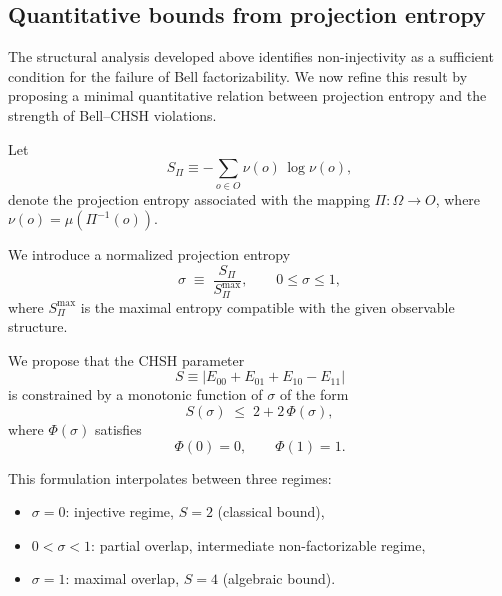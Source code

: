 \subsection{Quantitative bounds from projection entropy}
  \label{subsec:projection-entropy-bound}

  The structural analysis developed above identifies non-injectivity as a sufficient
  condition for the failure of Bell factorizability.
  We now refine this result by proposing a minimal quantitative relation between
  projection entropy and the strength of Bell--CHSH violations.

  Let
  \begin{equation}
    S_{\Pi} \equiv - \sum_{o \in O} \nu(o)\,\log \nu(o),
  \end{equation}
  denote the projection entropy associated with the mapping $\Pi : \Omega \to O$,
  where $\nu(o) = \mu(\Pi^{-1}(o))$.

  We introduce a normalized projection entropy
  \begin{equation}
    \sigma \;\equiv\; \frac{S_{\Pi}}{S_{\Pi}^{\max}},
    \qquad 0 \le \sigma \le 1,
  \end{equation}
  where $S_{\Pi}^{\max}$ is the maximal entropy compatible with the given observable
  structure.

  We propose that the CHSH parameter
  \begin{equation}
    S \equiv |E_{00} + E_{01} + E_{10} - E_{11}|
  \end{equation}
  is constrained by a monotonic function of $\sigma$ of the form
  \begin{equation}
    S(\sigma) \;\leq\; 2 + 2\,\Phi(\sigma),
    \label{eq:general-bound}
  \end{equation}
  where $\Phi(\sigma)$ satisfies
  \begin{equation}
    \Phi(0) = 0, \qquad \Phi(1) = 1.
  \end{equation}

  This formulation interpolates between three regimes:

  \begin{itemize}
    \item $\sigma = 0$: injective regime, $S = 2$ (classical bound),
    \item $0 < \sigma < 1$: partial overlap, intermediate non-factorizable regime,
    \item $\sigma = 1$: maximal overlap, $S = 4$ (algebraic bound).
  \end{itemize}

